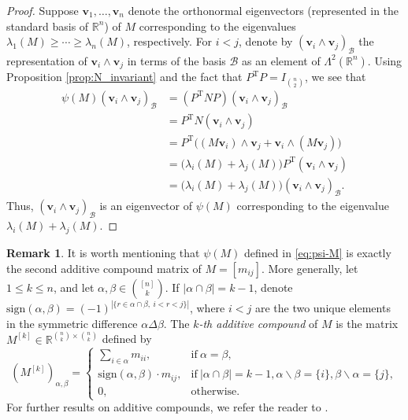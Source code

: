 \documentclass[11pt]{article}
\theoremstyle{plain}
\theoremstyle{definition}
\newtheorem*{remark}{Remark}
\numberwithin{equation}{section}
\begin{document}
\begin{proof}
Suppose $\bm{v}_1,\dots,\bm{v}_n$ denote the orthonormal eigenvectors (represented in the standard basis 
of $\mathbb{R}^n$) of $M$  corresponding to the eigenvalues $\lambda_1(M)\ge \cdots \ge \lambda_n(M)$, 
respectively. For $i<j$, denote by $(\bm{v}_i\wedge \bm{v}_j)_{\mathcal{B}}$ the representation of $\bm{v}_i\wedge \bm{v}_j$ 
in terms of the basis $\mathcal{B}$ as an element of $\Lambda^2 (\mathbb{R}^n)$. Using 
Proposition \ref{prop:N_invariant} and the fact that $P^{\mathrm{T}} P = I_{\binom{n}{2}}$, we see that
\begin{align*}
\psi(M)(\bm{v}_i\wedge \bm{v}_j)_{\mathcal{B}} 
& = (P^{\mathrm{T}} NP)(\bm{v}_i\wedge \bm{v}_j)_{\mathcal{B}} \\
& = P^{\mathrm{T}} N (\bm{v}_i\wedge \bm{v}_j) \\
& = P^{\mathrm{T}} \big((M\bm{v}_i)\wedge \bm{v}_j + \bm{v}_i\wedge (M\bm{v}_j)\big) \\
& = \big(\lambda_i(M)+\lambda_j(M)\big) P^{\mathrm{T}} (\bm{v}_i\wedge \bm{v}_j) \\
& = \big(\lambda_i(M)+\lambda_j(M)\big) (\bm{v}_i\wedge \bm{v}_j)_{\mathcal{B}}.
\end{align*}
Thus, $(\bm{v}_i\wedge \bm{v}_j)_{\mathcal{B}}$ is an eigenvector of $\psi(M)$ corresponding 
to the eigenvalue $\lambda_i(M)+\lambda_j(M)$. 
\end{proof}

\begin{remark}
It is worth mentioning that $\psi(M)$ defined in \eqref{eq:psi-M} is exactly the 
second additive compound matrix of $M=[m_{ij}]$. More generally, let $1 \leq k \leq n$, 
and let $\alpha, \beta\in \binom{[n]}{k}$. If $|\alpha\cap \beta|= k-1$, denote 
$\mathrm{sign} (\alpha,\beta) = (-1)^{|\{r\in\alpha\cap\beta,\ i<r<j\}|}$, 
where $i<j$ are the two unique elements in the symmetric difference $\alpha\Delta\beta$.
The \emph{$k$-th additive compound} of $M$ is the matrix
$M^{[k]}\in\mathbb{R}^{\binom{n}{k}\times\binom{n}{k}}$ defined by
\[
(M^{[k]})_{\alpha,\beta} =
\begin{cases}
\sum_{i\in\alpha} m_{ii}, & \text{if}\ \alpha = \beta, \\
\mathrm{sign} (\alpha, \beta)\cdot m_{ij}, & \text{if}\ |\alpha\cap\beta| = k-1, \alpha\backslash\beta = \{i\}, \beta\backslash\alpha = \{j\}, \\
0, & \text{otherwise}.
\end{cases}
\]
For further results on additive compounds, we refer the reader to \cite{Fiedler_1974}.
\end{remark}
\end{document}

